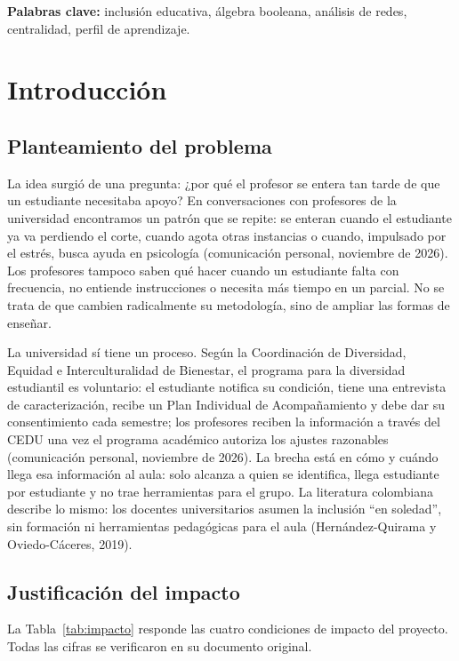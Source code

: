 \documentclass[12pt,letterpaper]{article}
\begin{document}
\noindent\textbf{Palabras clave:} inclusión educativa, álgebra booleana, análisis de redes, centralidad, perfil de aprendizaje.

\newpage
{\setlength{\parskip}{0pt}\tableofcontents}
\newpage

\section{Introducción}

\subsection{Planteamiento del problema}
La idea surgió de una pregunta: ¿por qué el profesor se entera tan tarde de que un estudiante necesitaba apoyo? En conversaciones con profesores de la universidad encontramos un patrón que se repite: se enteran cuando el estudiante ya va perdiendo el corte, cuando agota otras instancias o cuando, impulsado por el estrés, busca ayuda en psicología (comunicación personal, noviembre de 2026). Los profesores tampoco saben qué hacer cuando un estudiante falta con frecuencia, no entiende instrucciones o necesita más tiempo en un parcial. No se trata de que cambien radicalmente su metodología, sino de ampliar las formas de enseñar.

La universidad sí tiene un proceso. Según la Coordinación de Diversidad, Equidad e Interculturalidad de Bienestar, el programa para la diversidad estudiantil es voluntario: el estudiante notifica su condición, tiene una entrevista de caracterización, recibe un Plan Individual de Acompañamiento y debe dar su consentimiento cada semestre; los profesores reciben la información a través del CEDU una vez el programa académico autoriza los ajustes razonables (comunicación personal, noviembre de 2026). La brecha está en cómo y cuándo llega esa información al aula: solo alcanza a quien se identifica, llega estudiante por estudiante y no trae herramientas para el grupo. La literatura colombiana describe lo mismo: los docentes universitarios asumen la inclusión ``en soledad'', sin formación ni herramientas pedagógicas para el aula (Hernández-Quirama y Oviedo-Cáceres, 2019).

\subsection{Justificación del impacto}
La Tabla~\ref{tab:impacto} responde las cuatro condiciones de impacto del proyecto. Todas las cifras se verificaron en su documento original.
\end{document}
